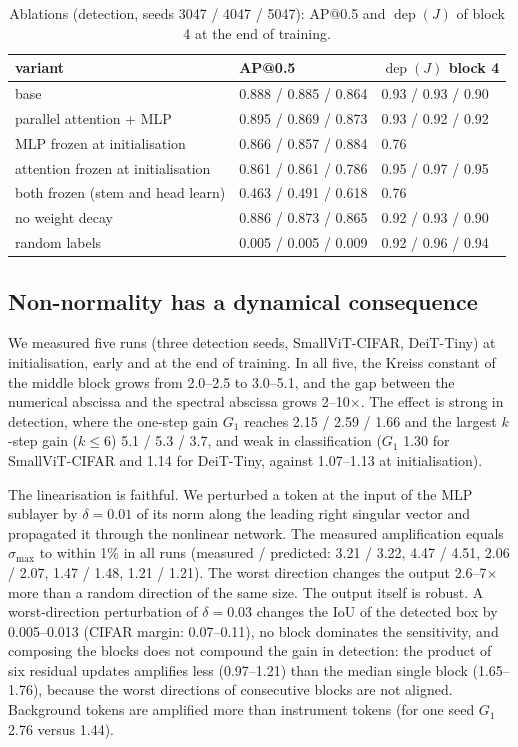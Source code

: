 \documentclass[10pt]{article}
\newcommand{\dep}{\operatorname{dep}}
\begin{document}
\begin{table}[t]
\centering
\caption{Ablations (detection, seeds 3047 / 4047 / 5047): AP@0.5 and $\dep(J)$ of block 4 at the end of training.}
\label{tab:ablation}
\begin{tabular}{lll}
\toprule
variant & AP@0.5 & $\dep(J)$ block 4\\
\midrule
base & 0.888 / 0.885 / 0.864 & 0.93 / 0.93 / 0.90\\
parallel attention + MLP & 0.895 / 0.869 / 0.873 & 0.93 / 0.92 / 0.92\\
MLP frozen at initialisation & 0.866 / 0.857 / 0.884 & 0.76\\
attention frozen at initialisation & 0.861 / 0.861 / 0.786 & 0.95 / 0.97 / 0.95\\
both frozen (stem and head learn) & 0.463 / 0.491 / 0.618 & 0.76\\
no weight decay & 0.886 / 0.873 / 0.865 & 0.92 / 0.93 / 0.90\\
random labels & 0.005 / 0.005 / 0.009 & 0.92 / 0.96 / 0.94\\
\bottomrule
\end{tabular}
\end{table}

\subsection{Non-normality has a dynamical consequence}
\label{sec:transient}

We measured five runs (three detection seeds, SmallViT-CIFAR, DeiT-Tiny) at initialisation, early and at the end of training. In all five,
the Kreiss constant of the middle block grows from 2.0--2.5 to 3.0--5.1, and the gap between the numerical abscissa and the spectral
abscissa grows 2--10$\times$. The effect is strong in detection, where the one-step gain $G_1$ reaches 2.15 / 2.59 / 1.66 and the
largest $k$-step gain ($k\le6$) 5.1 / 5.3 / 3.7, and weak in classification ($G_1$ 1.30 for SmallViT-CIFAR and 1.14 for DeiT-Tiny, against
1.07--1.13 at initialisation).

The linearisation is faithful. We perturbed a token at the input of the MLP sublayer by $\delta=0.01$ of its norm along the leading right
singular vector and propagated it through the nonlinear network. The measured amplification equals $\sigma_{\max}$ to within 1\% in all
runs (measured / predicted: 3.21 / 3.22, 4.47 / 4.51, 2.06 / 2.07, 1.47 / 1.48, 1.21 / 1.21). The worst direction changes the output
2.6--7$\times$ more than a random direction of the same size. The output itself is robust. A worst-direction perturbation of $\delta=0.03$
changes the IoU of the detected box by 0.005--0.013 (CIFAR margin: 0.07--0.11), no block dominates the sensitivity, and composing the
blocks does not compound the gain in detection: the product of six residual updates amplifies less (0.97--1.21) than the median single
block (1.65--1.76), because the worst directions of consecutive blocks are not aligned. Background tokens are amplified more than
instrument tokens (for one seed $G_1$ 2.76 versus 1.44).
\end{document}

